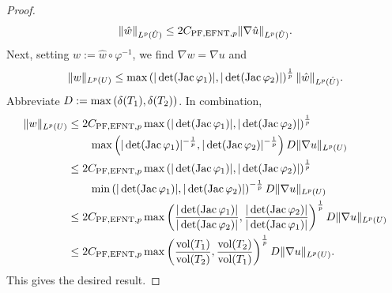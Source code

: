 \documentclass[10pt,letterpaper]{article}
\begin{document}
\begin{proof}
\begin{align*}
        \| \hat w \|_{L^{p}(\hat U)}
        \leq 
        2 C_{{\rm PF},{\rm EFNT},p}
        \| \nabla \hat u \|_{L^{p}(\hat U)}
        .
    \end{align*}
    Next, setting $w := \hat w \circ \varphi^{-1}$, we find $\nabla w = \nabla u$ and 
    \begin{align*}
        \| w \|_{L^{p}(U)}
        \leq 
        \max\left( 
            |\det(\operatorname{{\rm Jac}} \varphi_1)|
            ,
            |\det(\operatorname{{\rm Jac}} \varphi_2)|
        \right)^{\frac 1 p}
        \| \hat w \|_{L^{p}(\hat U)}
        .
    \end{align*}
    Abbreviate $D := \max\left( {\delta}(T_1), {\delta}(T_2) \right)$. In combination, 
    \begin{align*}
        \| w \|_{L^{p}(U)}
        &\leq 
        2 C_{{\rm PF},{\rm EFNT},p}
        \max\left( 
            |\det(\operatorname{{\rm Jac}} \varphi_1)|
            ,
            |\det(\operatorname{{\rm Jac}} \varphi_2)|
        \right)^{\frac 1 p}
        \\&\qquad 
        \max\left( 
            |\det(\operatorname{{\rm Jac}} \varphi_1)|^{-\frac 1 p} 
            ,
            |\det(\operatorname{{\rm Jac}} \varphi_2)|^{-\frac 1 p} 
        \right)
        D
        \| \nabla u \|_{L^{p}(U)}
        \\&
        \leq 
        2 C_{{\rm PF},{\rm EFNT},p}
        \max\left( 
            |\det(\operatorname{{\rm Jac}} \varphi_1)|
            ,
            |\det(\operatorname{{\rm Jac}} \varphi_2)|
        \right)^{\frac 1 p}
        \\&\qquad 
        \min\left( 
            |\det(\operatorname{{\rm Jac}} \varphi_1)|
            ,
            |\det(\operatorname{{\rm Jac}} \varphi_2)| 
        \right)^{-\frac 1 p} 
        D
        \| \nabla u \|_{L^{p}(U)}
        \\&
        \leq 
        2 C_{{\rm PF},{\rm EFNT},p}
        \max\left( 
            \frac{ |\det(\operatorname{{\rm Jac}} \varphi_1)| }{ |\det(\operatorname{{\rm Jac}} \varphi_2)| }
            ,
            \frac{ |\det(\operatorname{{\rm Jac}} \varphi_2)| }{ |\det(\operatorname{{\rm Jac}} \varphi_1)| }
        \right)^{\frac 1 p}
        D
        \| \nabla u \|_{L^{p}(U)}
        \\&
        \leq 
        2 C_{{\rm PF},{\rm EFNT},p}
        \max\left( 
            \frac{ \operatorname{vol}(T_1) }{ \operatorname{vol}(T_2) }
            ,
            \frac{ \operatorname{vol}(T_2) }{ \operatorname{vol}(T_1) }
        \right)^{\frac 1 p}
        D
        \| \nabla u \|_{L^{p}(U)}
        .
    \end{align*}
    This gives the desired result. 
\end{proof}
\end{document}
